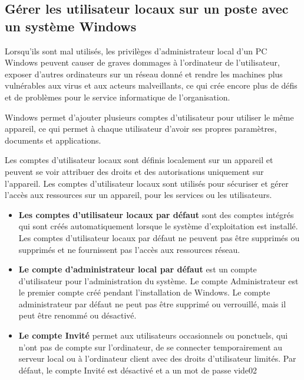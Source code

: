 \subsection*{Gérer les utilisateur locaux sur un poste avec un système Windows}
{}

\noindent Lorsqu'ils sont mal utilisés, les privilèges d'administrateur local d'un PC Windows peuvent causer de graves dommages à l'ordinateur de l'utilisateur, exposer d'autres ordinateurs sur un réseau donné et rendre les machines plus vulnérables aux virus et aux acteurs malveillants, ce qui crée encore plus de défis et de problèmes pour le service informatique de l'organisation.

\noindent Windows permet d’ajouter plusieurs comptes d’utilisateur pour utiliser le même appareil, ce qui permet à chaque utilisateur d’avoir ses propres paramètres, documents et applications. 

\newpage

\noindent Les comptes d’utilisateur locaux sont définis localement sur un appareil et peuvent se voir attribuer des droits et des autorisations uniquement sur l’appareil. Les comptes d’utilisateur locaux sont utilisés pour sécuriser et gérer l’accès aux ressources sur un appareil, pour les services ou les utilisateurs.

\begin{itemize}
  \item \textbf{Les comptes d’utilisateur locaux par défaut} sont des comptes intégrés qui sont créés automatiquement lorsque le système d’exploitation est installé. Les comptes d’utilisateur locaux par défaut ne peuvent pas être supprimés ou supprimés et ne fournissent pas l’accès aux ressources réseau.
  \item \textbf{Le compte d’administrateur local par défaut} est un compte d’utilisateur pour l’administration du système. Le compte Administrateur est le premier compte créé pendant l’installation de Windows. Le compte administrateur par défaut ne peut pas être supprimé ou verrouillé, mais il peut être renommé ou désactivé.
  \item \textbf{Le compte Invité} permet aux utilisateurs occasionnels ou ponctuels, qui n’ont pas de compte sur l’ordinateur, de se connecter temporairement au serveur local ou à l’ordinateur client avec des droits d’utilisateur limités. Par défaut, le compte Invité est désactivé et a un mot de passe vide02
\end{itemize}

